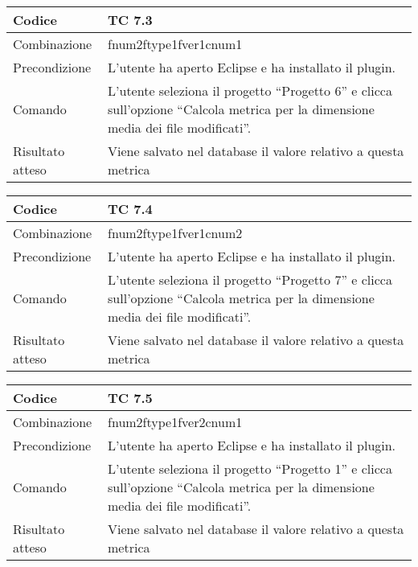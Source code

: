 \begin{table}[ht]
\begin{tabular}{|p{3cm}|p{9cm}|}
\hline
\cellcolor{lightgray}Codice				& TC 7.3								\\
\hline
\cellcolor{lightgray}Combinazione		& fnum2ftype1fver1cnum1								\\
\hline
\cellcolor{lightgray}Precondizione		& L'utente ha aperto Eclipse e ha installato il plugin.					\\
\hline
\cellcolor{lightgray}Comando			& L'utente seleziona il progetto ``Progetto 6''  e clicca sull'opzione ``Calcola metrica per la dimensione media dei file modificati''.	\\
\hline
\cellcolor{lightgray}Risultato atteso	& Viene salvato nel database il valore relativo a questa metrica	\\
\hline
\end{tabular}
\end{table}

\begin{table}[ht]
\begin{tabular}{|p{3cm}|p{9cm}|}
\hline
\cellcolor{lightgray}Codice				& TC 7.4								\\
\hline
\cellcolor{lightgray}Combinazione		& fnum2ftype1fver1cnum2							\\
\hline
\cellcolor{lightgray}Precondizione		& L'utente ha aperto Eclipse e ha installato il plugin.			\\
\hline
\cellcolor{lightgray}Comando			& L'utente seleziona il progetto ``Progetto 7''  e clicca sull'opzione ``Calcola metrica per la dimensione media dei file modificati''.	\\
\hline
\cellcolor{lightgray}Risultato atteso	& Viene salvato nel database il valore relativo a questa metrica	\\
\hline
\end{tabular}
\end{table}

\begin{table}[ht]
\begin{tabular}{|p{3cm}|p{9cm}|}
\hline
\cellcolor{lightgray}Codice				& TC 7.5								\\
\hline
\cellcolor{lightgray}Combinazione		& fnum2ftype1fver2cnum1 									\\
\hline
\cellcolor{lightgray}Precondizione		& L'utente ha aperto Eclipse e ha installato il plugin.			\\
\hline
\cellcolor{lightgray}Comando			& L'utente seleziona il progetto ``Progetto 1''  e clicca sull'opzione ``Calcola metrica per la dimensione media dei file modificati''.	\\
\hline
\cellcolor{lightgray}Risultato atteso	& Viene salvato nel database il valore relativo a questa metrica	\\
\hline
\end{tabular}
\end{table}

